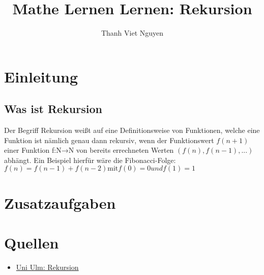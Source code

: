 \documentclass[11pt]{article}
\begin{document}
	\title{Mathe Lernen Lernen: Rekursion}
	\author{ Thanh Viet Nguyen}
	\maketitle
	\thispagestyle{fancy}
    \section{Einleitung}
    \subsection{Was ist Rekursion}
    Der Begriff Rekursion weißt auf eine Definitionsweise von Funktionen, welche
    eine Funktion ist nämlich genau dann rekursiv, wenn der Funktionswert $f(n+1)$
    einer Funktion f:N→N von bereits errechneten Werten $(f(n), f(n-1), ...)$ abhängt.
    Ein Beispiel hierfür wäre die Fibonacci-Folge:
\newline 
$
f(n) = f(n-1) + f(n-2)
\text{mit}
f(0) = 0 und f(1) = 1
$
	\section{Zusatzaufgaben}
     
    \section{Quellen}
    \begin{itemize}
        \item \href{https://www.uni-ulm.de/fileadmin/website_uni_ulm/iui.prog/vortraege/2006_2007_pi_1_vortrag/Rekursion.pdf}{Uni Ulm: Rekursion}
    \end{itemize}
\end{document}
